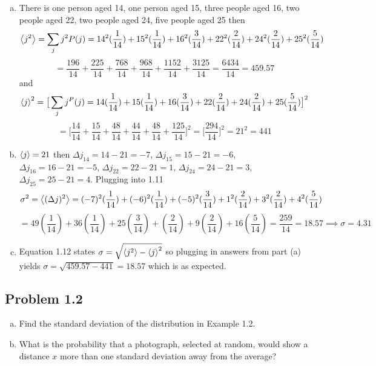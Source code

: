 \documentclass[12pt]{exam}
\begin{document}
\begin{solution}
    \begin{enumerate}[(a)]
        \item There is one person aged 14, one person aged 15, three people aged 16, two people aged 22, two people aged 24, five people aged 25 then 
        $$\expval{j^2} = \sum_j j^2 P(j) = 14^2(\frac{1}{14}) + 15^2(\frac{1}{14}) + 16^2(\frac{3}{14})+ 22^2(\frac{2}{14})+ 24^2(\frac{2}{14})+ 25^2(\frac{5}{14})$$
        $$= \frac{196}{14} + \frac{225}{14}+ \frac{768}{14}+ \frac{968}{14}+ \frac{1152}{14}+ \frac{3125}{14} = \frac{6434}{14} = 459.57$$
        and 
        $$\expval{j}^2 =  \big[\sum_j j^ P(j) = 14(\frac{1}{14}) + 15(\frac{1}{14}) + 16(\frac{3}{14})+ 22(\frac{2}{14})+ 24(\frac{2}{14})+ 25(\frac{5}{14})\big]^2$$
        $$= \big[ \frac{14}{14}+ \frac{15}{14} + \frac{48}{14} + \frac{44}{14} + \frac{48}{14} + \frac{125}{14}\big]^2 = \big[\frac{294}{14}\big]^2 = 21^2 = 441$$

        \item $\expval{j}=21$ then $\Delta j_{14} = 14-21 = -7$, $\Delta j_{15} = 15-21 = -6$, $\Delta j_{16} = 16-21 = -5$,  $\Delta j_{22} = 22-21 = 1$, $\Delta j_{24} = 24-21 = 3$, $\Delta j_{25} = 25-21 = 4$.  Plugging into 1.11 $$\sigma^2 = \expval{(\Delta j)^2}  = (-7)^2(\frac{1}{14}) + (-6)^2(\frac{1}{14}) + (-5)^2(\frac{3}{14})+ 1^2(\frac{2}{14})+ 3^2(\frac{2}{14})+ 4^2(\frac{5}{14})$$ 
        $$
        = 49(\frac{1}{14}) + 36(\frac{1}{14}) + 25(\frac{3}{14})+ (\frac{2}{14})+ 9(\frac{2}{14})+ 16(\frac{5}{14})= \frac{259}{14} = 18.57 \implies\sigma = 4.31$$

        \item Equation 1.12 states $\sigma = \sqrt{\expval{j^2}-\expval{j}^2}$ so plugging in answers from part (a) yields $\sigma =\sqrt{459.57-441} = 18.57$ which is as expected.
    \end{enumerate}
\end{solution}


\subsection*{Problem 1.2}
\begin{enumerate}[(a)]
    \item Find the standard deviation of the distribution in Example 1.2.


    \item What is the probability that a photograph, selected at random, would show a distance $x$ more than one standard deviation away from the average?
\end{enumerate}
\end{document}
